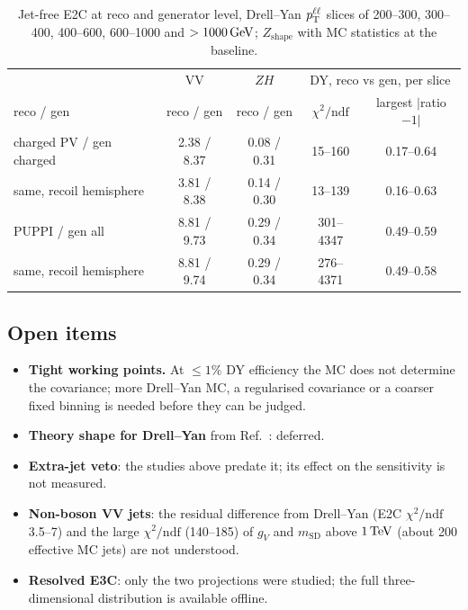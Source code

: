 \begin{table}[htbp]
\centering
\caption{Jet-free E2C at reco and generator level, Drell--Yan $p_{\mathrm{T}}^{\ell\ell}$ slices of 200--300, 300--400, 400--600, 600--1000
  and $> 1000\,\mathrm{GeV}$; $Z_\mathrm{shape}$ with MC statistics at the baseline.}
\label{tab:sens:genreco}
\small
\begin{tabular}{lcccc}
\toprule
 & VV & $ZH$ & \multicolumn{2}{c}{DY, reco vs gen, per slice} \\
reco / gen & reco / gen & reco / gen & $\chi^2/\mathrm{ndf}$ & largest $|$ratio$-1|$ \\
\midrule
charged PV / gen charged & 2.38 / 8.37 & 0.08 / 0.31 & 15--160 & 0.17--0.64 \\
same, recoil hemisphere & 3.81 / 8.38 & 0.14 / 0.30 & 13--139 & 0.16--0.63 \\
PUPPI / gen all & 8.81 / 9.73 & 0.29 / 0.34 & 301--4347 & 0.49--0.59 \\
same, recoil hemisphere & 8.81 / 9.74 & 0.29 / 0.34 & 276--4371 & 0.49--0.58 \\
\bottomrule
\end{tabular}
\end{table}

\subsection{Open items}
\label{app:sens:open}
\begin{itemize}
\item \textbf{Tight working points.} At $\le 1\%$ DY efficiency the MC does not determine the covariance; more
  Drell--Yan MC, a regularised covariance or a coarser fixed binning is needed before they can be judged.
\item \textbf{Theory shape for Drell--Yan} from Ref.~\cite{Generet:2026vto}: deferred.
\item \textbf{Extra-jet veto}: the studies above predate it; its effect on the sensitivity is not measured.
\item \textbf{Non-boson VV jets}: the residual difference from Drell--Yan (E2C $\chi^2/\mathrm{ndf}$ 3.5--7) and the large
  $\chi^2/\mathrm{ndf}$ (140--185) of $g_V$ and $m_\mathrm{SD}$ above $1\,\mathrm{TeV}$ (about 200 effective MC jets) are not
  understood.
\item \textbf{Resolved E3C}: only the two projections were studied; the full three-dimensional distribution is
  available offline.
\end{itemize}
